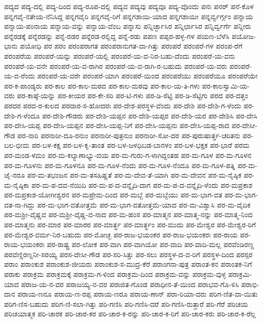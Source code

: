 ಪದ್ಯದ
ಪದ್ಯ-ದಲ್ಲಿ
ಪದ್ಯ-ದಿಂದ
ಪದ್ಯ-ರೂಪ-ದಲ್ಲಿ
ಪದ್ಯವ
ಪದ್ಯವು
ಪದ್ಯವೂ
ಪದ್ಯ-ವೊಂದು
ಪನಃ
ಪನರ್
ಪನೆ-ಕೊಳ
ಪನ್ನಗವೈ-ನತೇಯ-ನೆನಿಸಿದ್ದ
ಪನ್ನಗವೈರಿ
ಪನ್ನಗವೈ-ರಿಗೆ
ಪನ್ನಗಶಾಯಿ-ಯಾದ
ಪನ್ನಗಶಾಯೀ
ಪನ್ನರ್ವ್ವರ್ಗ್ಗಂ
ಪನ್ನಾಯ
ಪನ್ನಾಯ-ಪಂನಾಯ
ಪನ್ನಾಯ-ವನ್ನು
ಪನ್ನಾಯ-ವೆಂಬ
ಪನ್ನಾಸು
ಪನ್ನಿರ್ಚ್ಛಾಸಿರ
ಪನ್ನಿರ್ಛಾಸಿರ
ಪನ್ನಿರ್ವ್ವರ್ಗೆ
ಪನ್ನೀರು
ಪನ್ನೆರಡಕ್ಕೆ
ಪನ್ನೆರಡನ್ನು
ಪನ್ನೆ-ರಡರ
ಪನ್ನೆರಡ-ರಲ್ಲಿದ್ದ
ಪನ್ನೆ-ರಡು
ಪಪಣ
ಪಪ್ಪರ-ಹಳ್ಳ-ಗಳ
ಪಯಣ-ಬೆಳೆಸಿ
ಪಯೋಜ-ಭಾನು
ಪಯೋಧಿ
ಪರ
ಪರಂ
ಪರಂಪರಾಗತ
ಪರಂಪರಾನುಗತ-ವಾ-ಗಿತ್ತು
ಪರಂಪರೆ
ಪರಂಪರೆ-ಗಳ
ಪರಂಪ-ರೆಗೆ
ಪರಂಪರೆಯ
ಪರಂಪರೆ-ಯನ್ನು
ಪರಂಪರೆ-ಯಲ್ಲಿ
ಪರಂಪರೆ-ಯ-ವ-ನಿರ-ಬಹು-ದೆಂದು
ಪರಂಪರೆ-ಯ-ವನು
ಪರಂಪರೆ-ಯ-ವನೇ
ಪರಂಪರೆ-ಯ-ವ-ರಾಗಿರ
ಪರಂಪರೆ-ಯ-ವ-ರಾಗಿ-ರ-ಬಹುದು
ಪರಂಪರೆ-ಯ-ವರು
ಪರಂಪರೆ-ಯ-ವ-ರೆಂದು
ಪರಂಪರೆ-ಯ-ವರೇ
ಪರಂಪರೆ-ಯಾಗಿ
ಪರಂಪರೆ-ಯಿಂದ
ಪರಂಪರೆಯು
ಪರಂಪರೆಯೂ
ಪರಂಪರೆಯೇ
ಪರ-ಕ-ಪಾಂಡ್ಯರು
ಪರ-ಕಾಲ
ಪರ-ಕಾಲ-ಮಠದ
ಪರ-ಕಾಲ-ಮಠವು
ಪರ-ಕಾಲ-ಯ-ತಿ-ಗಳು
ಪರ-ಕಾಲಸ್ವಾಮಿ-ಯ-ವರು
ಪರ-ಕಾಷ್ಠೆ-ಯನ್ನು
ಪರ-ಕೀಯರ
ಪರ-ಕೇ-ಸರಿ
ಪರ-ಟಿ-ಗಳು
ಪರ-ಡಿ-ಸೆಟ್ಟಿ
ಪರ-ಡಿ-ಸೆಟ್ಟಿಗು
ಪರದ
ಪರ-ದತ್ತಂ
ಪರದರ
ಪರದ-ರ-ಕುಲದ
ಪರದಾರ-ಸ-ಹೋದರಃ
ಪರ-ದೇಶ-ಪರಸ್ಥಳ-ವೆಂದು
ಪರ-ದೇಶಿ
ಪರ-ದೇಶಿ-ಗ-ಳೆಂದು
ಪರ-ದೇಶಿ-ಗ-ಳೆಂದೂ
ಪರ-ದೇಶಿ-ಗೌಡರು
ಪರ-ದೇಶಿ-ಯಪ್ಪನ
ಪರ-ದೇಶಿ-ಯಪ್ಪರ
ಪರ-ದೇಶಿ-ಯರ
ಪರ-ದೇಶಿಸಿ
ಪರ-ದೇಸಿ
ಪರ-ದೇಸಿ-ಯಪ್ಪ
ಪರ-ದೇಸಿ-ಯಪ್ಪನ
ಪರ-ದೇಸಿ-ಯಪ್ಪ-ನಿಗೆ
ಪರ-ದೇಸಿ-ಯಪ್ಪನು
ಪರ-ದೇಸಿ-ಯಪ್ಪ-ರಾದ
ಪರ-ದೇಸೀ-ಗೌಡ
ಪರ-ನಾರಿ
ಪರನಾರೀ-ದೂ-ರನುಂ
ಪರನಾರೀ-ಪುತ್ರನುಂ
ಪರನಾರೀ-ಸೋ-ದರ
ಪರ-ಪುರುಷಾರ್ತ್ತ-ಚರಿತನು
ಪರ-ಬಲ-ಭೀಮ
ಪರ-ಬಳ-ಕಕ್ಷ
ಪರ-ಬಳ-ಕೃ-ತಾಂತ
ಪರ-ಬಳ-ಜಳಧಿಬಡ-ಬಾನಳಂ
ಪರ-ಬಳ-ಭಕ್ಷಕ
ಪರ-ಭಾರೆ
ಪರಮ
ಪರ-ಮಂಡ-ಳಮಂ
ಪರ-ಮ-ಕಲ್ಯಾಣಾಭ್ಯು-ದಯ
ಪರ-ಮ-ಗುರು-ಗ-ಳಾಗಿದ್ದಂತಹ
ಪರ-ಮ-ಗೂಳ
ಪರ-ಮ-ಗೂಳನ
ಪರ-ಮ-ಗೂಳನು
ಪರ-ಮ-ಗೂಳನೂ
ಪರ-ಮ-ಗೂಳ-ನೆಂದು
ಪರ-ಮ-ಗೂಳ-ನೆಂದೂ
ಪರ-ಮ-ಗೂಳ-ಪತ್ನಿ
ಪರ-ಮ-ಜೈ-ನರೂ
ಪರ-ಮ-ತಭಂಜನ
ಪರ-ಮ-ತಸಹಿಷ್ಣತೆ
ಪರ-ಮ-ದೇವ-ತೆ-ಯಾಗಿ
ಪರ-ಮ-ದೇವನ
ಪರ-ಮ-ನೈಷ್ಠಿಕ
ಪರ-ಮ-ನೈಷ್ಠಿಕಾ
ಪರ-ಮ-ಪ-ದವ-ನೆಯಿದಿ
ಪರ-ಮ-ಪ-ದ-ವನ್ನೈದಿ-ದಾಗ
ಪರ-ಮ-ಪ-ದ-ವನ್ನೈದಿ-ಳೆಂದು
ಪರ-ಮಪ್ರಕಾಶ
ಪರ-ಮಪ್ರಕಾಶ-ಯೋಗೀಶ್ವರನ
ಪರ-ಮಪ್ರೇಮ-ದಿಂದ
ಪರ-ಮಬ್ಬೆ
ಪರ-ಮಬ್ಬೆಯು
ಪರ-ಮ-ಭಾಗ-ವತ
ಪರ-ಮ-ಭಾಗ-ವತ-ನಾ-ಗಿದ್ದು
ಪರ-ಮ-ಭಾಗ-ವತೋತ್ತಮೆ
ಪರ-ಮ-ಭಾಗ-ವತೋತ್ತಮೆ-ಯಾದ
ಪರ-ಮ-ವಿಶ್ವಾಸಿ
ಪರ-ಮ-ವೈದಿಕ
ಪರ-ಮಶ್ರೀ-ವೈಷ್ಣವ
ಪರ-ಮಶ್ರೀ-ವೈಷ್ಣ-ವ-ನಾದ
ಪರ-ಮ-ಹಂಸ
ಪರ-ಮಾತ್ಮನ
ಪರ-ಮಾತ್ಮ-ನನ್ನು
ಪರ-ಮಾತ್ಮ-ನಿಂದ
ಪರ-ಮಾತ್ಮನು
ಪರ-ಮಾರ
ಪರ-ಮಾರರ
ಪರ-ಮಾರ್ತ್ಥ
ಪರ-ಮಾರ್ತ್ಥಂ
ಪರ-ಮುದು
ಪರ-ಮೇಶ್ವರ
ಪರ-ಮೇಶ್ವರ-ರಿಗೆ
ಪರ-ಮೇಶ್ವರ-ವರ್ಮ-ನಿರ-ಬಹುದು
ಪರ-ಮೋಚ್ಛ
ಪರ-ರಾಜ-ಭಯಂಕರ
ಪರ-ರಾಜ-ಭಯಂಕರಃ
ಪರ-ರಾಯ
ಪರ-ರಾಯ-ಭಯಂಕರಃ
ಪರ-ರಾಷ್ಟ್ರ
ಪರ-ಲೋಕ
ಪರ-ವಾಗಿ
ಪರ-ವಾಗಿಯೋ
ಪರ-ವಾದಿ
ಪರ-ವಾದಿ-ಮಲ್ಲ
ಪರವೆಂಡಿರಣ್ಣ
ಪರವೆಣ್ಡಿರಣ್ನನೀ-ಸರಯ್ಯ
ಪರಸ-ದೇಸೀ-ಗೌಡ
ಪರ-ಸರಿ-ಸಿತ್ತು
ಪರ-ಸಲು
ಪರಸ್ಥಳ-ದ-ವ-ರಿಗೆ
ಪರಸ್ಥಳ-ದಿಂದ
ಪರಸ್ಪರ
ಪರಾಂ
ಪರಾಂಕುಶ
ಪರಾಂಕುಶ-ಜೀಯರು
ಪರಾಂಕುಶ-ಸ-ಮುದ್ರ-ಕೆರೆ
ಪರಾಂಗನಾ-ಪುತ್ರ
ಪರಾಂತ-ಕನ
ಪರಾಂತಕ-ನಿಗೆ
ಪರಾಕು
ಪರಾಕ್ರಮ
ಪರಾಕ್ರಮಕ್ಕೆ
ಪರಾಕ್ರಮ-ಗ-ಳಿಂದ
ಪರಾಕ್ರಮ-ದಿಂದ
ಪರಾಕ್ರಮ-ವನ್ನು
ಪರಾಕ್ರಮ-ವುಳ್ಳ
ಪರಾಕ್ರಮಿ-ಯಾದ
ಪರಾಜ-ಯ-ನ-ವರ
ಪರಾಜಯ್ಯ-ನ-ವರ
ಪರಾಜಿತ-ಗೊಂಡ
ಪರಾಧೀನ-ತೆ-ಯಿಂದ
ಪರಾಭವ-ಗೊ-ಳಿಸಿ
ಪರಾಭಿ-ದಾನ
ಪರಾಯ-ಣನೂ
ಪರಾಯ-ಣ-ರಪ್ಪ
ಪರಾಯ-ಣರೂ
ಪರಾಯ-ಣಾನ್
ಪರಾ-ರಿಯಾ-ದರು
ಪರಿಗ-ಣಿತ-ವಾ-ಯಿತು
ಪರಿಗ-ಣಿಸ-ಬಹುದು
ಪರಿಗ-ಣಿ-ಸಲಾ-ಗಿತ್ತು
ಪರಿ-ಗಣಿಸಿ
ಪರಿ-ಗಣಿಸಿ-ದರೆ
ಪರಿ-ಗಣಿಸಿ-ರುತ್ತಾರೆ
ಪರಿ-ಗೆರೆ
ಪರಿಚಯ
ಪರಿಚಯಾತ್ಮಕ
ಪರಿ-ಚಾರಕ
ಪರಿ-ಚಾರ-ಕರ
ಪರಿ-ಚಾರ-ಕ-ರನ್ನು
ಪರಿ-ಚಾರ-ಕ-ರಿಗೆ
ಪರಿ-ಚಾರ-ಕರು
ಪರಿ-ಚಾರ-ಕ-ರೆಲ್ಲ
